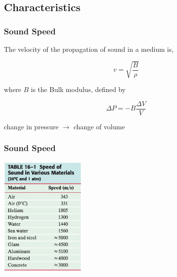 \documentclass[]{beamer}
\begin{document}
\subsection{Characteristics}

\begin{frame}
\frametitle{Sound Speed}

The velocity of the propagation of sound in a medium is,

\begin{equation}
v=\sqrt{\frac{B}{\rho}}
\end{equation}

\pause

where $B$ is the Bulk modulus, defined by

\begin{equation*}
\Delta P=-B\frac{\Delta V}{V}
\end{equation*}

\pause
change in pressure \pause $\rightarrow$ change of volume 

 



  \end{frame}




\begin{frame}
\frametitle{Sound Speed}


  \begin{center}
  \includegraphics[height=2.4in]{images4/sound_speed.jpg}
\end{center}




  \end{frame}



\end{document}
